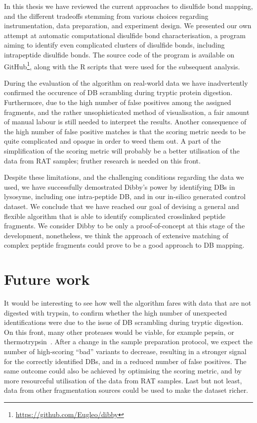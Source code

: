 
In this thesis we have reviewed the current approaches to disulfide bond mapping, and the different tradeoffs stemming from various choices regarding instrumentation, data preparation, and experiment design. We presented our own attempt at automatic computational disulfide bond characterisation, a program aiming to identify even complicated clusters of disulfide bonds, including intrapeptide disulfide bonds. The source code of the program is available on GitHub\footnote{\url{https://github.com/Eugleo/dibby}}, along with the R scripts that were used for the subsequent analysis.

During the evaluation of the algorithm on real-world data we have inadvertently confirmed the occurence of DB scrambling during tryptic protein digestion. Furthermore, due to the high number of false positives among the assigned fragments, and the rather unsophisticated method of visualisation, a fair amount of manual labour is still needed to interpret the results. Another consequence of the high number of false positive matches is that the scoring metric needs to be quite complicated and opaque in order to weed them out. A part of the simplification of the scoring metric will probably be a better utilisation of the data from RAT samples; fruther research is needed on this front.

Despite these limitations, and the challenging conditions regarding the data we used, we have successfully demostrated Dibby's power by identifying DBs in lysosyme, including one intra-peptide DB, and in our in-silico generated control dataset. We conclude that we have reached our goal of devising a general and flexible algorithm that is able to identify complicated crosslinked peptide fragments. We consider Dibby to be only a proof-of-concept at this stage of the development, nonetheless, we think the approach of extensive matching of complex peptide fragments could prove to be a good approach to DB mapping.

\section*{Future work}

It would be interesting to see how well the algorithm fares with data that are not digested with trypsin, to confirm whether the high number of unexpected identifications were due to the issue of DB scrambling during tryptic digestion. On this front, many other proteases would be viable, for example pepsin, or thermotrypsin~\cite{sung2016evaluation}. After a change in the sample preparation protocol, we expect the number of high-scoring ``bad'' variants to decrease, resulting in a stronger signal for the correctly identified DBs, and in a reduced number of false positives. The same outcome could also be achieved by optimising the scoring metric, and by more resourceful utilisation of the data from RAT samples. Last but not least, data from other fragmentation sources could be used to make the dataset richer.

